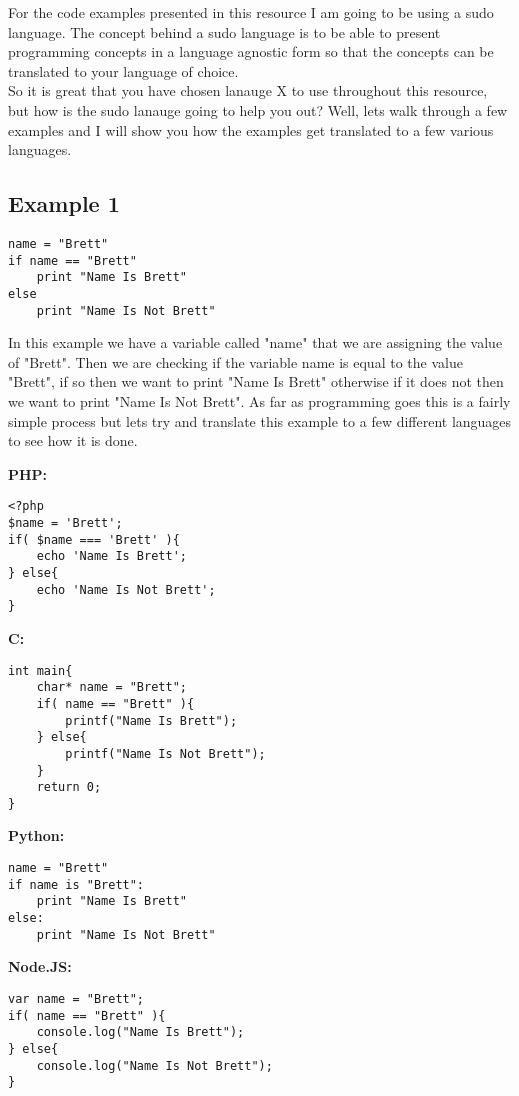 For the code examples presented in this resource I am going to be using a sudo language. The concept behind a sudo language
is to be able to present programming concepts in a language agnostic form so that the concepts can be translated to your
language of choice.
\newline
\\
So it is great that you have chosen lanauge X to use throughout this resource, but how is the sudo lanauge going to help you out?
Well, lets walk through a few examples and I will show you how the examples get translated to a few various languages.

\subsection{Example 1}
\begin{lstlisting}
name = "Brett"
if name == "Brett"
    print "Name Is Brett"
else
    print "Name Is Not Brett"
\end{lstlisting}

In this example we have a variable called "name" that we are assigning the value of "Brett". Then we are checking if the
variable name is equal to the value "Brett", if so then we want to print "Name Is Brett" otherwise if it does not then we want to 
print "Name Is Not Brett". As far as programming goes this is a fairly simple process but lets try and translate this example
to a few different languages to see how it is done.

{\bf PHP:}
\begin{lstlisting}
<?php
$name = 'Brett';
if( $name === 'Brett' ){
    echo 'Name Is Brett';
} else{
    echo 'Name Is Not Brett';
}
\end{lstlisting}

{\bf C:}
\begin{lstlisting}
int main{
    char* name = "Brett";
    if( name == "Brett" ){
        printf("Name Is Brett");
    } else{
        printf("Name Is Not Brett");
    }
    return 0;
}
\end{lstlisting}

{\bf Python:}
\begin{lstlisting}
name = "Brett"
if name is "Brett":
    print "Name Is Brett"
else:
    print "Name Is Not Brett"
\end{lstlisting}

{\bf Node.JS:}
\begin{lstlisting}
var name = "Brett";
if( name == "Brett" ){
    console.log("Name Is Brett");
} else{
    console.log("Name Is Not Brett");
}
\end{lstlisting}


